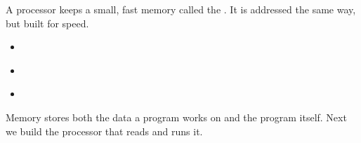 \documentclass[mathserif, handout]{beamer}
\begin{document}
\begin{frame}
  A processor keeps a small, fast memory called the . It is addressed the same way, but built for speed.\\[3mm]
  \begin{itemize}
    \item {} \\[1.5mm]
    \item {} \\[1.5mm]
    \item {}
  \end{itemize}
  \vspace{2mm}
  \begin{center}
  \end{center}
\end{frame}

\begin{frame}
  \begin{center}
    Memory stores both the data a program works on and the program itself. Next we build the processor that reads and runs it.
  \end{center}
\end{frame}
\end{document}
